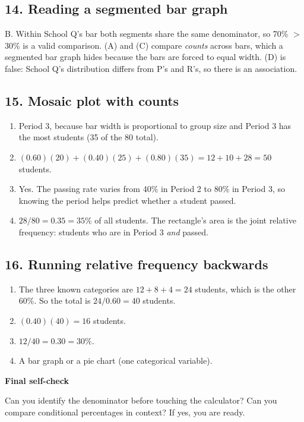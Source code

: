 \documentclass[11pt]{article}
\newcommand{\ans}[1]{\textcolor{AnswerBlue}{#1}}
\begin{document}
\subsection*{14. Reading a segmented bar graph}
\begin{answerbox}
\ans{B.} Within School Q's bar both segments share the same denominator, so 70\% $>$ 30\% is a valid comparison. (A) and (C) compare \emph{counts} across bars, which a segmented bar graph hides because the bars are forced to equal width. (D) is false: School Q's distribution differs from P's and R's, so there is an association.
\end{answerbox}

\subsection*{15. Mosaic plot with counts}
\begin{answerbox}
\begin{enumerate}[label=\alph*.]
  \item \ans{Period 3, because bar width is proportional to group size and Period 3 has the most students (35 of the 80 total).}
  \item \ans{$(0.60)(20)+(0.40)(25)+(0.80)(35)=12+10+28=50$ students.}
  \item \ans{Yes. The passing rate varies from 40\% in Period 2 to 80\% in Period 3, so knowing the period helps predict whether a student passed.}
  \item \ans{$28/80=0.35=35\%$ of all students. The rectangle's area is the joint relative frequency: students who are in Period 3 \emph{and} passed.}
\end{enumerate}
\end{answerbox}

\subsection*{16. Running relative frequency backwards}
\begin{answerbox}
\begin{enumerate}[label=\alph*.]
  \item \ans{The three known categories are $12+8+4=24$ students, which is the other $60\%$. So the total is $24/0.60=40$ students.}
  \item \ans{$(0.40)(40)=16$ students.}
  \item \ans{$12/40=0.30=30\%$.}
  \item \ans{A bar graph or a pie chart (one categorical variable).}
\end{enumerate}
\end{answerbox}

\begin{tcolorbox}[colback=Navy,colframe=Navy,arc=2mm,boxrule=0pt]
\centering
{\large\bfseries\color{white} Final self-check}\par
\color{white}Can you identify the denominator before touching the calculator? Can you compare conditional percentages in context? If yes, you are ready.
\end{tcolorbox}
\end{document}

